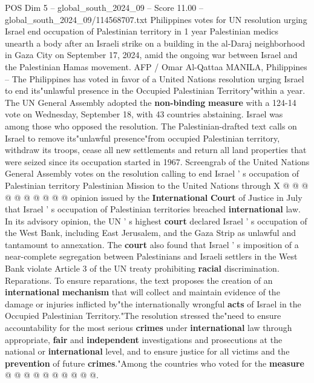 \begin{textsample}{POS Dim 5 – global\_south\_2024\_09 – Score 11.00 – global\_south\_2024\_09/114568707.txt}  \label{ex:f5_pos_260}
Philippines votes for UN resolution urging Israel end occupation of Palestinian territory in 1 year Palestinian medics unearth a body after an Israeli strike on a building in the al-Daraj neighborhood in Gaza City on September 17, 2024, amid the ongoing war between Israel and the Palestinian Hamas movement.
AFP / Omar Al-Qattaa MANILA, Philippines -- The Philippines has voted in favor of a United Nations resolution urging Israel to end its"unlawful presence in the Occupied Palestinian Territory"within a year.
The UN General Assembly adopted the \textbf{non-binding} \textbf{measure} with a 124-14 vote on Wednesday, September 18, with 43 countries abstaining.
Israel was among those who opposed the resolution.
The Palestinian-drafted text calls on Israel to remove its"unlawful presence"from occupied Palestinian territory, withdraw its troops, cease all new settlements and return all land properties that were seized since its occupation started in 1967.
Screengrab of the United Nations General Assembly votes on the resolution calling to end Israel ' s occupation of Palestinian territory Palestinian Mission to the United Nations through X @ @ @ @ @ @ @ @ @ @ opinion issued by the \textbf{International} \textbf{Court} of Justice in July that Israel ' s occupation of Palestinian territories breached \textbf{international} law.
In its advisory opinion, the UN ' s highest \textbf{court} declared Israel ' s occupation of the West Bank, including East Jerusalem, and the Gaza Strip as unlawful and tantamount to annexation.
The \textbf{court} also found that Israel ' s imposition of a near-complete segregation between Palestinians and Israeli settlers in the West Bank violate Article 3 of the UN treaty prohibiting \textbf{racial} discrimination.
Reparations.
To ensure reparations, the text proposes the creation of an \textbf{international} \textbf{mechanism} that will collect and maintain evidence of the damage or injuries inflicted by"the internationally wrongful \textbf{acts} of Israel in the Occupied Palestinian Territory."The resolution stressed the"need to ensure accountability for the most serious \textbf{crimes} under \textbf{international} law through appropriate, \textbf{fair} and \textbf{independent} investigations and prosecutions at the national or \textbf{international} level, and to ensure justice for all victims and the \textbf{prevention} of future \textbf{crimes}."Among the countries who voted for the \textbf{measure} @ @ @ @ @ @ @ @ @ @.

\end{textsample}
